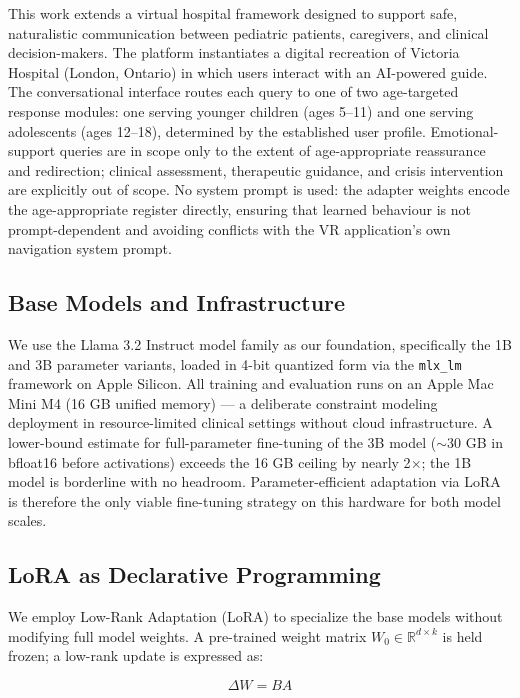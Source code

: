 \documentclass[journal]{IEEEtai}
\begin{document}
This work extends a virtual hospital framework designed to support safe, naturalistic communication between pediatric patients, caregivers, and clinical decision-makers. The platform instantiates a digital recreation of Victoria Hospital (London, Ontario) in which users interact with an AI-powered guide. The conversational interface routes each query to one of two age-targeted response modules: one serving younger children (ages 5--11) and one serving adolescents (ages 12--18), determined by the established user profile. Emotional-support queries are in scope only to the extent of age-appropriate reassurance and redirection; clinical assessment, therapeutic guidance, and crisis intervention are explicitly out of scope. No system prompt is used: the adapter weights encode the age-appropriate register directly, ensuring that learned behaviour is not prompt-dependent and avoiding conflicts with the VR application's own navigation system prompt.

\subsection{Base Models and Infrastructure}

We use the Llama 3.2 Instruct model family \cite{dubey2024llama3} as our foundation, specifically the 1B and 3B parameter variants, loaded in 4-bit quantized form via the \texttt{mlx\_lm} framework \cite{apple2023mlx} on Apple Silicon. All training and evaluation runs on an Apple Mac Mini M4 (16 GB unified memory) --- a deliberate constraint modeling deployment in resource-limited clinical settings without cloud infrastructure. A lower-bound estimate for full-parameter fine-tuning of the 3B model ($\sim$30 GB in bfloat16 before activations) exceeds the 16 GB ceiling by nearly 2$\times$; the 1B model is borderline with no headroom. Parameter-efficient adaptation via LoRA is therefore the only viable fine-tuning strategy on this hardware for both model scales.

\subsection{LoRA as Declarative Programming}

We employ Low-Rank Adaptation (LoRA) \cite{hu2022lora} to specialize the base models without modifying full model weights. A pre-trained weight matrix $W_0 \in \mathbb{R}^{d \times k}$ is held frozen; a low-rank update is expressed as:

\begin{equation}
\Delta W = BA
\end{equation}
\end{document}
